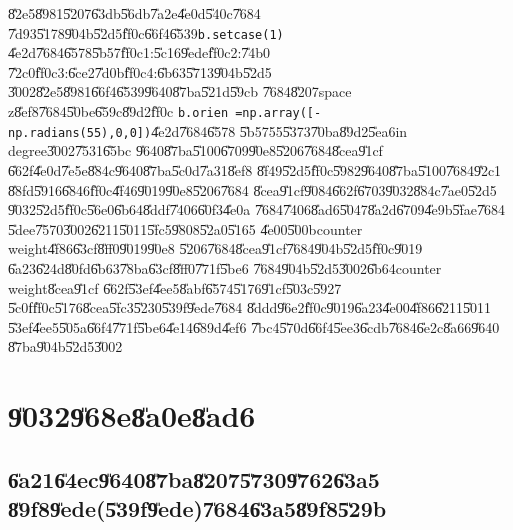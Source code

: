 \U{82e5}\U{8981}\U{5207}\U{63db}\U{56db}\U{7a2e}\U{4e0d}\U{540c}\U{7684}%
\U{7d93}\U{5178}\U{904b}\U{52d5}\U{ff0c}\U{66f4}\U{6539}\texttt{b.setcase(1)}%
\U{4e2d}\U{7684}\U{6578}\U{5b57}\U{ff0c}1:\U{5c16}\U{9ede}\U{ff0c}2:\U{74b0}%
\U{72c0}\U{ff0c}3:\U{6ce2}\U{7d0b}\U{ff0c}4:\U{6b63}\U{5713}\U{904b}\U{52d5}%
\U{3002}\U{82e5}\U{8981}\U{66f4}\U{6539}\U{9640}\U{87ba}\U{521d}\U{59cb}%
\U{7684}\U{8207}space z\U{8ef8}\U{7684}\U{50be}\U{659c}\U{89d2}\U{ff0c}%
\newline
\texttt{b.orien =np.array([-np.radians(55),0,0])}\U{4e2d}\U{7684}\U{6578}%
\U{5b57}55\U{5373}\U{70ba}\U{89d2}\U{5ea6}in degree\U{3002}\U{7531}\U{65bc}%
\U{9640}\U{87ba}\U{5100}\U{6709}\U{90e8}\U{5206}\U{7684}\U{8cea}\U{91cf}%
\U{662f}\U{4e0d}\U{7e5e}\U{884c}\U{9640}\U{87ba}\U{5c0d}\U{7a31}\U{8ef8}%
\U{8f49}\U{52d5}\U{ff0c}\U{5982}\U{9640}\U{87ba}\U{5100}\U{7684}\U{92c1}%
\U{88fd}\U{5916}\U{6846}\U{ff0c}\U{4f46}\U{9019}\U{90e8}\U{5206}\U{7684}%
\U{8cea}\U{91cf}\U{9084}\U{662f}\U{6703}\U{9032}\U{884c}\U{7ae0}\U{52d5}%
\U{9032}\U{52d5}\U{ff0c}\U{56e0}\U{6b64}\U{8ddf}\U{7406}\U{60f3}\U{4e0a}%
\U{7684}\U{7406}\U{8ad6}\U{5047}\U{8a2d}\U{6709}\U{4e9b}\U{5fae}\U{7684}%
\U{5dee}\U{7570}\U{3002}\U{6211}\U{5011}\U{5fc5}\U{9808}\U{52a0}\U{5165}%
\U{4e00}\U{500b}counter weight\U{4f86}\U{63cf}\U{8ff0}\U{9019}\U{90e8}%
\U{5206}\U{7684}\U{8cea}\U{91cf}\U{7684}\U{904b}\U{52d5}\U{ff0c}\U{9019}%
\U{6a23}\U{624d}\U{80fd}\U{6b63}\U{78ba}\U{63cf}\U{8ff0}\U{771f}\U{5be6}%
\U{7684}\U{904b}\U{52d5}\U{3002}\U{6b64}counter weight\U{8cea}\U{91cf}%
\U{662f}\U{53ef}\U{4ee5}\U{8abf}\U{6574}\U{5176}\U{91cf}\U{503c}\U{5927}%
\U{5c0f}\U{ff0c}\U{5176}\U{8cea}\U{5fc3}\U{5230}\U{539f}\U{9ede}\U{7684}%
\U{8ddd}\U{96e2}\U{ff0c}\U{9019}\U{6a23}\U{4e00}\U{4f86}\U{6211}\U{5011}%
\U{53ef}\U{4ee5}\U{505a}\U{66f4}\U{771f}\U{5be6}\U{4e14}\U{689d}\U{4ef6}%
\U{7bc4}\U{570d}\U{66f4}\U{5ee3}\U{6cdb}\U{7684}\U{6e2c}\U{8a66}\U{9640}%
\U{87ba}\U{904b}\U{52d5}\U{3002}

\clearpage%

\section{\U{9032}\U{968e}\U{8a0e}\U{8ad6}}

\subsection{\U{6a21}\U{64ec}\U{9640}\U{87ba}\U{8207}\U{5730}\U{9762}\U{63a5}%
\U{89f8}\U{9ede}(\U{539f}\U{9ede})\U{7684}\U{63a5}\U{89f8}\U{529b}}

